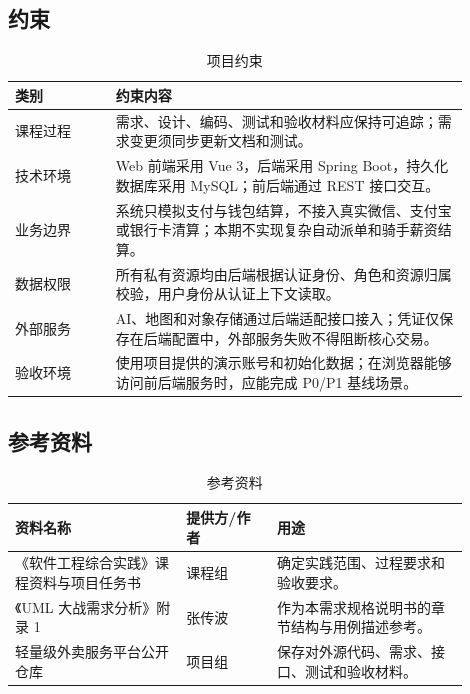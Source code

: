 \subsection{约束}

\begin{longtable}{|L{0.20\linewidth}|L{0.70\linewidth}|}
\caption{项目约束}\label{tab:constraints}\\ \hline
\textbf{类别} & \textbf{约束内容} \\ \hline
课程过程 & 需求、设计、编码、测试和验收材料应保持可追踪；需求变更须同步更新文档和测试。 \\ \hline
技术环境 & Web 前端采用 Vue 3，后端采用 Spring Boot，持久化数据库采用 MySQL；前后端通过 REST 接口交互。 \\ \hline
业务边界 & 系统只模拟支付与钱包结算，不接入真实微信、支付宝或银行卡清算；本期不实现复杂自动派单和骑手薪资结算。 \\ \hline
数据权限 & 所有私有资源均由后端根据认证身份、角色和资源归属校验，用户身份从认证上下文读取。 \\ \hline
外部服务 & AI、地图和对象存储通过后端适配接口接入；凭证仅保存在后端配置中，外部服务失败不得阻断核心交易。 \\ \hline
验收环境 & 使用项目提供的演示账号和初始化数据；在浏览器能够访问前后端服务时，应能完成 P0/P1 基线场景。 \\ \hline
\end{longtable}

\subsection{参考资料}

\begin{longtable}{|L{0.34\linewidth}|L{0.18\linewidth}|L{0.38\linewidth}|}
\caption{参考资料}\label{tab:references}\\ \hline
\textbf{资料名称} & \textbf{提供方/作者} & \textbf{用途} \\ \hline
《软件工程综合实践》课程资料与项目任务书 & 课程组 & 确定实践范围、过程要求和验收要求。 \\ \hline
《UML 大战需求分析》附录 1 & 张传波 & 作为本需求规格说明书的章节结构与用例描述参考。 \\ \hline
轻量级外卖服务平台公开仓库 & 项目组 & 保存对外源代码、需求、接口、测试和验收材料。 \\ \hline
\end{longtable}
